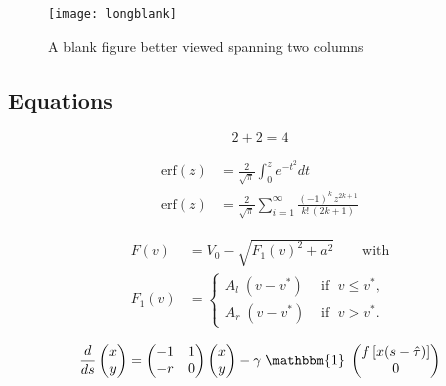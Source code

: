 \documentclass[aps,pre,twocolumn,nofootinbib]{revtex4}
\begin{document}


%
% 
\begin{figure*}[hbtp]
\centering
\texttt{[image: longblank]} 
\caption{A blank figure better viewed spanning two columns}
\label{fig:longblank}
\end{figure*}

\subsection{Equations}

\begin{equation}
\label{2and2is4}
2 + 2 = 4
\end{equation}

\begin{align*} %
\text{erf}(z) &= \frac{2}{\sqrt{\pi}} \int_0^z e^{-t^2} dt    \\
 \text{erf}(z)& =  \frac{2}{\sqrt{\pi}} \sum_{i=1}^{\infty} \frac{(-1)^k \, z^{2 k + 1}}{k! \,(2 k + 1)}
\end{align*}

\begin{equation}
\begin{split} %
F(v) &= V_0 - \sqrt{ F_1(v)^2 + a^2} \qquad \text{with} \\
F_1(v) &= 
\begin{cases}
A_l \; (v - v^*) &  \text{  if }\; v \le v^* ,\\
A_r \; (v - v^*) & \text{  if  }\; v > v^* .
\end{cases}
\end{split}
\label{tentnl}
\end{equation}


\begin{equation}
\label{matrixeq}
\frac{d}{ds} 
\begin{pmatrix}
          x \\
          y 
\end{pmatrix}
=
\begin{pmatrix}
          -1 & 1 \\
          -r & 0 
\end{pmatrix}
\begin{pmatrix}
          x \\
          y 
\end{pmatrix}
- \gamma \; \mathbbm{1} \;
\begin{pmatrix}
 f\left[ x(s - \hat{\tau}) \right] \\
0
\end{pmatrix}
\end{equation}
 
\end{document}
